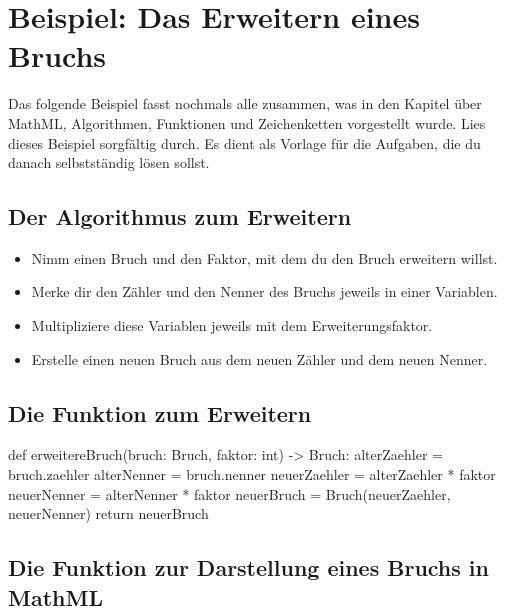 \section{Beispiel: Das Erweitern eines Bruchs}

Das folgende Beispiel fasst nochmals alle zusammen, was in den Kapitel über MathML, Algorithmen, Funktionen und Zeichenketten vorgestellt wurde. Lies dieses Beispiel sorgfältig durch. Es dient als Vorlage für die Aufgaben, die du danach selbstständig lösen sollst.

\subsection{Der Algorithmus zum Erweitern}

\begin{itemize}
	\item Nimm einen Bruch und den Faktor, mit dem du den Bruch erweitern willst.
	\item Merke dir den Zähler und den Nenner des Bruchs jeweils in einer Variablen.
	\item Multipliziere diese Variablen jeweils mit dem Erweiterungsfaktor.
	\item Erstelle einen neuen Bruch aus dem neuen Zähler und dem neuen Nenner.
\end{itemize}

\subsection{Die Funktion zum Erweitern}
\label{sec:FunktionErweitern}

\begin{codePython}
def erweitereBruch(bruch: Bruch, faktor: int) -> Bruch:
	alterZaehler = bruch.zaehler
	alterNenner = bruch.nenner
	neuerZaehler = alterZaehler * faktor
	neuerNenner = alterNenner * faktor
	neuerBruch = Bruch(neuerZaehler, neuerNenner)
	return neuerBruch
\end{codePython}

\subsection{Die Funktion zur Darstellung eines Bruchs in MathML}
\label{sec:FunktionSchreibeBruch}

